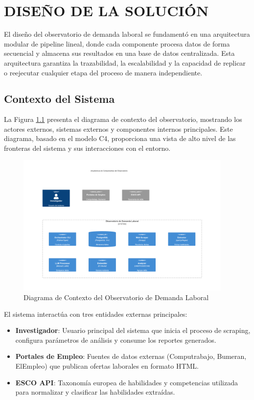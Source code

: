 \chapter{DISEÑO DE LA SOLUCIÓN}

El diseño del observatorio de demanda laboral se fundamentó en una arquitectura modular de pipeline lineal, donde cada componente procesa datos de forma secuencial y almacena sus resultados en una base de datos centralizada. Esta arquitectura garantiza la trazabilidad, la escalabilidad y la capacidad de replicar o reejecutar cualquier etapa del proceso de manera independiente.

\section{Contexto del Sistema}

La Figura \ref{fig:contexto-sistema} presenta el diagrama de contexto del observatorio, mostrando los actores externos, sistemas externos y componentes internos principales. Este diagrama, basado en el modelo C4, proporciona una vista de alto nivel de las fronteras del sistema y sus interacciones con el entorno.

\begin{figure}[H]
\centering
\includegraphics[width=0.95\textwidth]{diagrams/Contexto(Faltan conexiones).png}
\caption{Diagrama de Contexto del Observatorio de Demanda Laboral}
\label{fig:contexto-sistema}
\end{figure}

El sistema interactúa con tres entidades externas principales:

\begin{itemize}
    \item \textbf{Investigador}: Usuario principal del sistema que inicia el proceso de scraping, configura parámetros de análisis y consume los reportes generados.
    \item \textbf{Portales de Empleo}: Fuentes de datos externas (Computrabajo, Bumeran, ElEmpleo) que publican ofertas laborales en formato HTML.
    \item \textbf{ESCO API}: Taxonomía europea de habilidades y competencias utilizada para normalizar y clasificar las habilidades extraídas.
\end{itemize}

